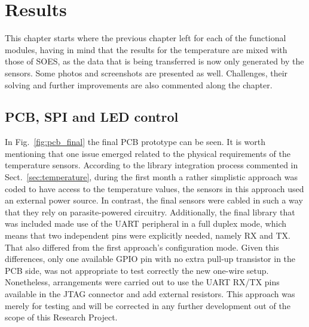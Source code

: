 \chapter{Results}\label{cha:results}

        
This chapter starts where the previous chapter left for each of the functional modules, having in mind that the results for the 
temperature are mixed with those of SOES, as the data that is being transferred is now only generated by the sensors. Some photos
and screenshots are presented as well. Challenges, their solving and further improvements are also commented along the chapter.


\section{PCB, SPI and LED control}

In Fig.~\ref{fig:pcb_final} the final PCB prototype can be seen. It is worth mentioning that one issue
emerged
related to the physical requirements of the temperature sensors. 
According to the library integration process commented in Sect.~\ref{sec:temperature}, 
during the first month a rather simplistic approach was coded to have access to the temperature values, the sensors in this approach
used an 
external power source. In contrast, the final sensors were cabled in such a way that they rely on parasite-powered circuitry.
Additionally, the final library that was included made use of the UART peripheral in a full duplex mode, which means that two independent 
pins were explicitly needed, namely RX and TX. That also differed from the first approach's configuration mode. Given this differences, 
only one available GPIO pin with no extra pull-up transistor in the PCB side, was not appropriate to test correctly the 
new one-wire setup. Nonetheless, arrangements were carried out to use the UART RX/TX pins available in the JTAG connector and add external resistors. 
This approach was merely for testing and will be corrected in any further development out of the scope of this Research Project.


